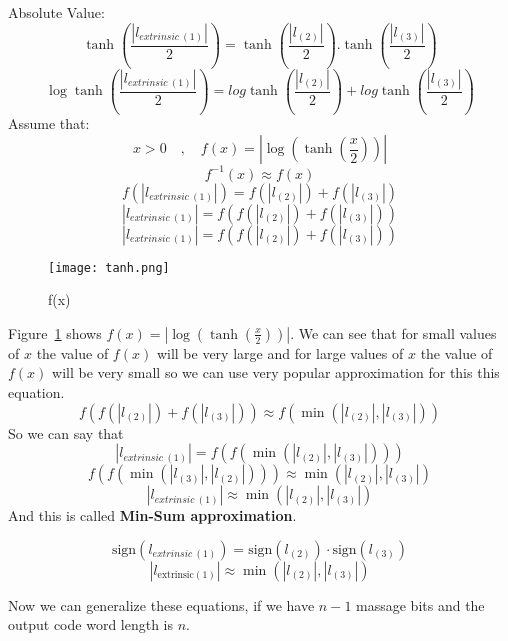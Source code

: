 Absolute Value:
\[\tanh{\left(\frac{\left|l_{extrinsic\ (1)}\right|}{2}\right)=\tanh{\left(\frac{\left|l_{(2)}\right|}{2}\right).\tanh{\left(\frac{\left|l_{(3)}\right|}{2}\right)}}}\]
\[\log\tanh{\left(\frac{\left|l_{extrinsic\ (1)}\right|}{2}\right)=log\tanh{\left(\frac{\left|l_{(2)}\right|}{2}\right)+log\tanh{\left(\frac{\left|l_{(3)}\right|}{2}\right)}}}\]
Assume that:
\[x>0 \quad,\quad f\left(x\right)=\left|\log{\left(\tanh{\left(\frac{x}{2}\right)}\right)}\right|\]
\[f^{-1}\left(x\right)\approx f\left(x\right)\]
\[f\left(\left|l_{extrinsic\ \left(1\right)}\right|\right)=f\left(\left|l_{\left(2\right)}\right|\right)+f(\left|l_{\left(3\right)}\right|)\]
\[\left|l_{extrinsic\ \left(1\right)}\right|=f(f\left(\left|l_{\left(2\right)}\right|\right)+f\left(\left|l_{\left(3\right)}\right|\right))\]
\[ \left|l_{extrinsic\ \left(1\right)}\right|=f(f\left(\left|l_{\left(2\right)}\right|\right)+f\left(\left|l_{\left(3\right)}\right|\right)) \]
\begin{figure}[h]
    \centering
    \texttt{[image: tanh.png]}
    \caption{f(x)}
    \label{fig:logtanh}
\end{figure}
Figure~\ref{fig:logtanh} shows $f\left(x\right)=|\log\left(\tanh{\left(\frac{x}{2}\right)}\right)|$. We can see that for small values of $x$ the value of $f(x)$ will be very large and for large values of $x$ the value of $f(x)$ will be very small so we can use very popular approximation for this this equation.
\[f(f\left(\left|l_{\left(2\right)}\right|\right)+f\left(\left|l_{\left(3\right)}\right|\right))\approx f(\min{\left(\left|l_{\left(2\right)}\right|,\left|l_{\left(3\right)}\right|\right)})\]
So we can say that 
\[\left|l_{extrinsic\ \left(1\right)}\right|=f(f(\min\left(\left|l_{\left(2\right)}\right|,\left|l_{\left(3\right)}\right|\right)))\]
\[f(f(\min\left(\left|l_{\left(3\right)}\right|,\left|l_{\left(2\right)}\right|\right)))\approx\min\left(\left|l_{\left(2\right)}\right|,\left|l_{\left(3\right)}\right|\right)\]
\[\left|l_{extrinsic\ \left(1\right)}\right|\approx\min\left(\left|l_{\left(2\right)}\right|,\left|l_{\left(3\right)}\right|\right)\]
And this is called \textbf{Min-Sum approximation}.
\begin{GrayBox}
    \[ \text{sign}\left(l_{extrinsic\ \left(1\right)}\right)=\text{sign}\left(l_{\left(2\right)}\right)\cdot \text{sign}(l_{\left(3\right)}) \]
    \[ \left|l_{\text{extrinsic} \left(1\right)}\right|\approx\min\left(\left|l_{\left(2\right)}\right|,\left|l_{\left(3\right)}\right|\right) \]
\end{GrayBox}
Now we can generalize these equations, if we have $n-1$ massage bits and the output code word length is $n$.
